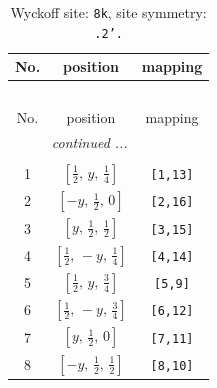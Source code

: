 \documentclass[fleqn,8pt]{jsarticle}
\begin{document}
\begin{longtable}{ccc}
\caption{Wyckoff site: {\tt 8k}, site symmetry: {\tt .2'.}}
 \\
 \hline \hline
No. & position & mapping \\ \hline \endfirsthead

\multicolumn{2}{l}{\tablename\ \thetable{}} \\
 \hline \hline
No. & position & mapping \\ \hline \endhead

 \hline \hline
\multicolumn{2}{r}{\footnotesize\it continued ...} \\ \endfoot

 \hline \hline
\multicolumn{2}{r}{} \\ \endlastfoot

1 & $\left[ \frac{1}{2},\, y,\, \frac{1}{4} \right]$ & {\tt [1,13]} \\ \hline
2 & $\left[ - y,\, \frac{1}{2},\, 0 \right]$ & {\tt [2,16]} \\ \hline
3 & $\left[ y,\, \frac{1}{2},\, \frac{1}{2} \right]$ & {\tt [3,15]} \\ \hline
4 & $\left[ \frac{1}{2},\, - y,\, \frac{1}{4} \right]$ & {\tt [4,14]} \\ \hline
5 & $\left[ \frac{1}{2},\, y,\, \frac{3}{4} \right]$ & {\tt [5,9]} \\ \hline
6 & $\left[ \frac{1}{2},\, - y,\, \frac{3}{4} \right]$ & {\tt [6,12]} \\ \hline
7 & $\left[ y,\, \frac{1}{2},\, 0 \right]$ & {\tt [7,11]} \\ \hline
8 & $\left[ - y,\, \frac{1}{2},\, \frac{1}{2} \right]$ & {\tt [8,10]} \\
\end{longtable}
\renewcommand{\arraystretch}{1.2}
\end{document}
